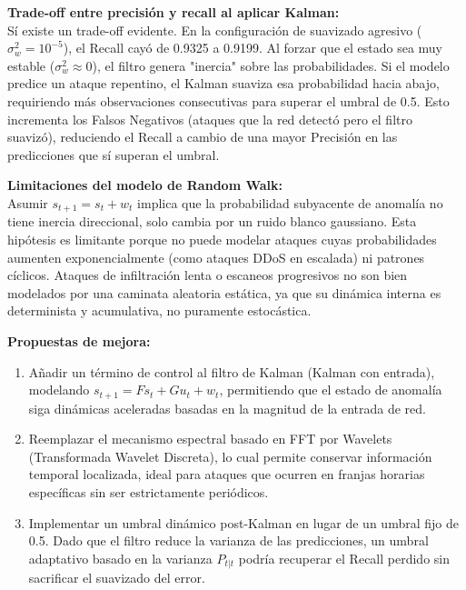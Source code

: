 \documentclass[12pt,a4paper]{article}
\begin{document}
\textbf{Trade-off entre precisión y recall al aplicar Kalman:}\\
Sí existe un trade-off evidente. En la configuración de suavizado agresivo ($\sigma_w^2=10^{-5}$), el Recall cayó de 0.9325 a 0.9199. Al forzar que el estado sea muy estable ($\sigma_w^2 \approx 0$), el filtro genera "inercia" sobre las probabilidades. Si el modelo predice un ataque repentino, el Kalman suaviza esa probabilidad hacia abajo, requiriendo más observaciones consecutivas para superar el umbral de 0.5. Esto incrementa los Falsos Negativos (ataques que la red detectó pero el filtro suavizó), reduciendo el Recall a cambio de una mayor Precisión en las predicciones que sí superan el umbral.

\textbf{Limitaciones del modelo de Random Walk:}\\
Asumir $s_{t+1} = s_t + w_t$ implica que la probabilidad subyacente de anomalía no tiene inercia direccional, solo cambia por un ruido blanco gaussiano. Esta hipótesis es limitante porque no puede modelar ataques cuyas probabilidades aumenten exponencialmente (como ataques DDoS en escalada) ni patrones cíclicos. Ataques de infiltración lenta o escaneos progresivos no son bien modelados por una caminata aleatoria estática, ya que su dinámica interna es determinista y acumulativa, no puramente estocástica.

\textbf{Propuestas de mejora:}\\
\begin{enumerate}
    \item Añadir un término de control al filtro de Kalman (Kalman con entrada), modelando $s_{t+1} = F s_t + G u_t + w_t$, permitiendo que el estado de anomalía siga dinámicas aceleradas basadas en la magnitud de la entrada de red.
    \item Reemplazar el mecanismo espectral basado en FFT por Wavelets (Transformada Wavelet Discreta), lo cual permite conservar información temporal localizada, ideal para ataques que ocurren en franjas horarias específicas sin ser estrictamente periódicos.
    \item Implementar un umbral dinámico post-Kalman en lugar de un umbral fijo de 0.5. Dado que el filtro reduce la varianza de las predicciones, un umbral adaptativo basado en la varianza $P_{t|t}$ podría recuperar el Recall perdido sin sacrificar el suavizado del error.
\end{enumerate}
\end{document}
